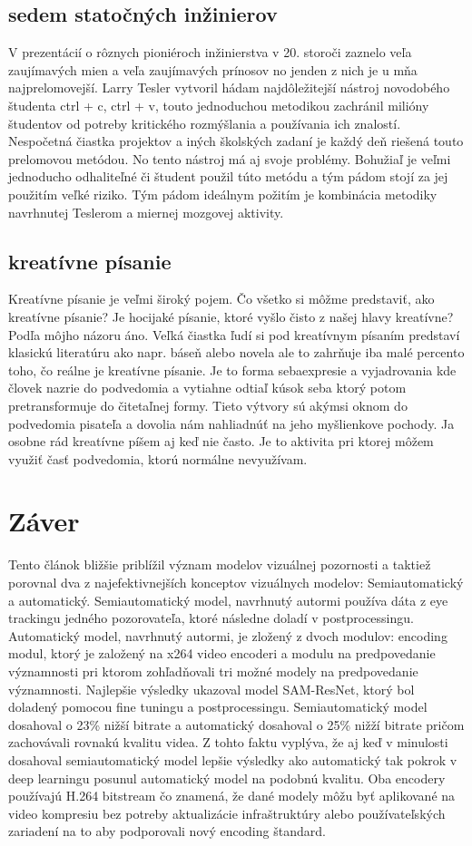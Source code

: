 \documentclass[10pt,twoside,slovak,a4paper]{article}
\begin{document}
\subsection{sedem statočných inžinierov}
V prezentácií o rôznych pioniéroch inžinierstva v 20. storoči zaznelo veľa zaujímavých mien a veľa zaujímavých prínosov no jenden z nich je u mňa najprelomovejší. Larry Tesler vytvoril hádam najdôležitejší nástroj novodobého študenta ctrl + c, ctrl + v, touto jednoduchou metodikou zachránil milióny študentov od potreby kritického rozmýšlania a používania ich znalostí. Nespočetná čiastka projektov a iných školských zadaní je každý deň riešená touto prelomovou metódou. No tento nástroj má aj svoje problémy. Bohužiaľ je veľmi jednoducho odhaliteľné či študent použil túto metódu a tým pádom stojí za jej použitím veľké riziko. Tým pádom ideálnym požitím je kombinácia metodiky navrhnutej Teslerom a miernej mozgovej aktivity.

\subsection{kreatívne písanie}
Kreatívne písanie je veľmi široký pojem. Čo všetko si môžme predstaviť, ako kreatívne písanie? Je hocijaké písanie, ktoré vyšlo čisto z našej hlavy kreatívne? Podľa môjho názoru áno. Veľká čiastka ľudí si pod kreatívnym písaním predstaví klasickú literatúru ako napr. báseň alebo novela ale to zahrňuje iba malé percento toho, čo reálne je kreatívne písanie. Je to forma sebaexpresie a vyjadrovania kde človek nazrie do podvedomia a vytiahne odtiaľ kúsok seba ktorý potom pretransformuje do čitetaľnej formy. Tieto výtvory sú akýmsi oknom do podvedomia pisateľa a dovolia nám nahliadnúť na jeho myšlienkove pochody. Ja osobne rád kreatívne píšem aj keď nie často. Je to aktivita pri ktorej môžem využiť časť podvedomia, ktorú normálne nevyužívam.

\section{Záver} \label{zaver} 
Tento článok bližšie priblížil význam modelov vizuálnej pozornosti a taktiež porovnal dva z najefektivnejších konceptov vizuálnych modelov: Semiautomatický a automatický. Semiautomatický model, navrhnutý autormi\cite{Coplien:MPD} používa dáta z eye trackingu jedného pozorovateľa, ktoré následne doladí v postprocessingu. Automatický model, navrhnutý autormi\cite{Czarnecki:Progress}, je zložený z dvoch modulov: encoding modul, ktorý je založený na x264 video encoderi a modulu na predpovedanie významnosti pri ktorom zohľadňovali tri možné modely na predpovedanie významnosti. Najlepšie výsledky ukazoval model SAM-ResNet, ktorý bol doladený pomocou fine tuningu a postprocessingu. Semiautomatický model dosahoval o 23\% nižší bitrate a automatický dosahoval o 25\% nižží bitrate pričom zachovávali rovnakú kvalitu videa. Z tohto faktu vyplýva, že aj keď v minulosti dosahoval semiautomatický model lepšie výsledky ako automatický tak pokrok v deep learningu posunul automatický model na podobnú kvalitu. Oba encodery používajú H.264 bitstream čo znamená, že dané modely môžu byť aplikované na video kompresiu bez potreby aktualizácie infraštruktúry alebo používateľských zariadení na to aby podporovali nový encoding štandard.
\end{document}

